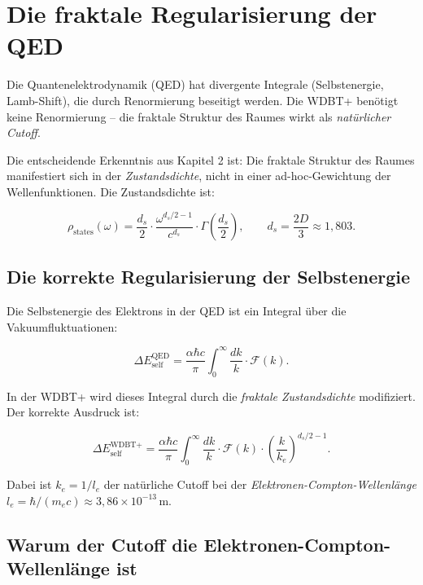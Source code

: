 \chapter{Die fraktale Regularisierung der QED}

Die Quantenelektrodynamik (QED) hat divergente Integrale (Selbstenergie, Lamb-Shift), die durch Renormierung beseitigt werden. Die WDBT+ benötigt keine
Renormierung – die fraktale Struktur des Raumes wirkt als \emph{natürlicher Cutoff}.

Die entscheidende Erkenntnis aus Kapitel 2 ist: Die fraktale Struktur des Raumes manifestiert sich in der \emph{Zustandsdichte}, nicht in einer ad-hoc-Gewichtung der
Wellenfunktionen. Die Zustandsdichte ist:

\begin{equation}
\rho_{\text{states}}(\omega) = \frac{d_s}{2} \cdot \frac{\omega^{d_s/2 - 1}}{c^{d_s}} \cdot \Gamma\left(\frac{d_s}{2}\right), \qquad d_s = \frac{2D}{3} \approx 1,803. \tag{7.1}
\end{equation}

\section{Die korrekte Regularisierung der Selbstenergie}

Die Selbstenergie des Elektrons in der QED ist ein Integral über die Vakuumfluktuationen:

\begin{equation}
\Delta E_{\text{self}}^{\text{QED}} = \frac{\alpha \hbar c}{\pi} \int_0^{\infty} \frac{dk}{k} \cdot \mathcal{F}(k). \tag{7.2}
\end{equation}

In der WDBT+ wird dieses Integral durch die \emph{fraktale Zustandsdichte} modifiziert. Der korrekte Ausdruck ist:

\begin{equation}
\Delta E_{\text{self}}^{\text{WDBT+}} = \frac{\alpha \hbar c}{\pi} \int_0^{\infty} \frac{dk}{k} \cdot \mathcal{F}(k) \cdot \left( \frac{k}{k_e} \right)^{d_s/2 - 1}. \tag{7.3}
\end{equation}

Dabei ist \( k_e = 1/l_e \) der natürliche Cutoff bei der \emph{Elektronen-Compton-Wellenlänge} \( l_e = \hbar/(m_e c) \approx 3,86 \times 10^{-13} \, \text{m} \).

\section{Warum der Cutoff die Elektronen-Compton-Wellenlänge ist}

